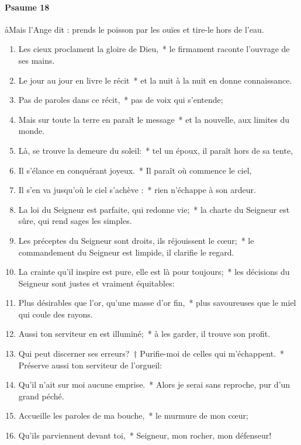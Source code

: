 \documentclass[twoside]{article}
\begin{document}
\begin{paracol}[1]{2}
\switchcolumn

\paragraph{Psaume 18}
\aa Mais l’Ange dit : prends le poisson par les ouïes et tire-le hors de l’eau.


\begin{enumerate}[wide, itemsep=0mm, labelwidth=!, labelindent=0pt, label=\color{gregoriocolor}\theenumi]
\item Les cieux proclament la gloire de Dieu,~* le firmament raconte l'ouvrage de ses mains.
\item Le jour au jour en livre le récit~* et la nuit à la nuit en donne connaissance.
\item Pas de paroles dans ce récit,~* pas de voix qui s'entende;
\item Mais sur toute la terre en paraît le message~* et la nouvelle, aux limites du monde.
\item Là, se trouve la demeure du soleil:~* tel un époux, il paraît hors de sa tente,
\item Il s'élance en conquérant joyeux.~* Il paraît où commence le ciel,
\item Il s'en va jusqu'où le ciel s'achève :~* rien n'échappe à son ardeur.
\item La loi du Seigneur est parfaite, qui redonne vie;~* la charte du Seigneur est sûre, qui rend sages les simples.
\item Les préceptes du Seigneur sont droits, ils réjouissent le cœur;~* le commandement du Seigneur est limpide, il clarifie le regard.
\item La crainte qu'il inspire est pure, elle est là pour toujours;~* les décisions du Seigneur sont justes et vraiment équitables:
\item Plus désirables que l'or, qu'une masse d'or fin,~* plus savoureuses que le miel qui coule des rayons.
\item Aussi ton serviteur en est illuminé;~* à les garder, il trouve son profit.
\item Qui peut discerner ses erreurs?~† Purifie-moi de celles qui m'échappent.~* Préserve aussi ton serviteur de l'orgueil: 
\item Qu'il n'ait sur moi aucune emprise.~* Alors je serai sans reproche, pur d'un grand péché.
\item Accueille les paroles de ma bouche,~* le murmure de mon cœur;
\item Qu'ils parviennent devant toi,~* Seigneur, mon rocher, mon défenseur!
\end{enumerate}


\end{paracol}
\end{document}
